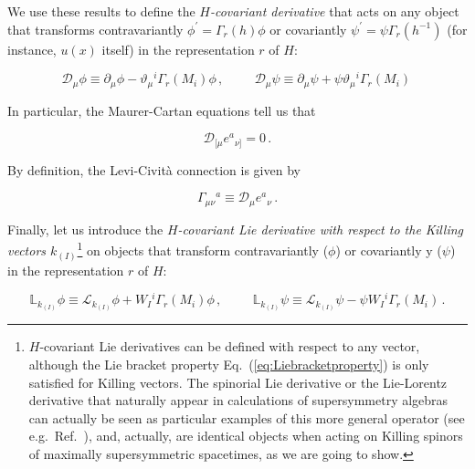 \documentclass[12pt,a4paper]{article}
\begin{document}
We use these results to define the {\it $H$-covariant derivative} that
acts on any object that transforms contravariantly $\phi^{\prime} =
\Gamma_{r}(h)\phi$ or covariantly $\psi^{\prime} =
\psi\Gamma_{r}(h^{-1})$ (for instance, $u(x)$ itself) in the
representation $r$ of $H$:

\begin{equation}
\mathcal{D}_{\mu}\phi\equiv \partial_{\mu}\phi 
- \vartheta_{\mu}{}^{i}\Gamma_{r}(M_{i})\phi\, ,
\hspace{1cm}  
\mathcal{D}_{\mu}\psi\equiv \partial_{\mu}\psi 
+\psi\vartheta_{\mu}{}^{i}\Gamma_{r}(M_{i})\, 
\end{equation}

In particular, the Maurer-Cartan equations tell us that 

\begin{equation}
\mathcal{D}_{[\mu}e^{a}{}_{\nu]}=0\, .
\end{equation}

By definition, the Levi-Civit\`a connection is given by 

\begin{equation}
\Gamma_{\mu\nu}{}^{a}\equiv\mathcal{D}_{\mu}e^{a}{}_{\nu}\, .
\end{equation}

Finally, let us introduce the {\it $H$-covariant Lie derivative with
  respect to the Killing vectors $k_{(I)}$}\footnote{$H$-covariant Lie
  derivatives can be defined with respect to any vector, although the
  Lie bracket property Eq.~(\ref{eq:Liebracketproperty}) is only
  satisfied for Killing vectors.  The spinorial Lie derivative
  \cite{kn:Lich,kn:Kos,kn:Kos2} or the Lie-Lorentz derivative that
  naturally appear in calculations of supersymmetry algebras
  \cite{Figueroa-O'Farrill:1999va,Ortin:2002qb} can actually be seen
  as particular examples of this more general operator (see
  e.g.~Ref.~\cite{kn:GoMa}), and, actually, are identical objects when
  acting on Killing spinors of maximally supersymmetric spacetimes, as
  we are going to show.} on objects that transform contravariantly
($\phi$) or covariantly y ($\psi$) in the representation $r$ of $H$:

\begin{equation}
\mathbb{L}_{k_{(I)}}\phi\equiv 
\mathcal{L}_{k_{(I)}}\phi +W_{I}{}^{i}\Gamma_{r}(M_{i})\phi\, ,
\hspace{1cm}  
\mathbb{L}_{k_{(I)}}\psi\equiv 
\mathcal{L}_{k_{(I)}}\psi -\psi W_{I}{}^{i}\Gamma_{r}(M_{i})\, .
\end{equation}
\end{document}

